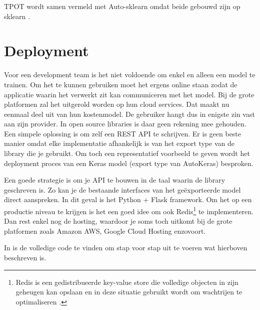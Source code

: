 TPOT wordt samen vermeld met Auto-sklearn omdat beide gebouwd zijn op sklearn \autocite{Olson2016}.

\section{Deployment}
\label{sec:deployment}

Voor een development team is het niet voldoende om enkel en alleen een model te trainen. Om het te kunnen gebruiken moet het ergens online staan zodat de applicatie waarin het verwerkt zit kan communiceren met het model. Bij de grote platformen zal het uitgerold worden op hun cloud services. Dat maakt nu eenmaal deel uit van hun kostenmodel. De gebruiker hangt dus in enigste zin vast aan zijn provider. 
In open source libraries is daar geen rekening mee gehouden. Een simpele oplossing is om zelf een REST API te schrijven. Er is geen beste manier omdat elke implementatie afhankelijk is van het export type van de library die je gebruikt. Om toch een representatief voorbeeld te geven wordt het deployment proces van een Keras model (export type van AutoKeras) besproken. 

Een goede strategie is om je API te bouwen in de taal waarin de library geschreven is. Zo kan je de bestaande interfaces van het geëxporteerde model direct aanspreken. In dit geval is het Python + Flask framework. Om het op een productie niveau te krijgen is het een goed idee om ook Redis\footnote{Redis is een gedistribueerde key-value store die volledige objecten in zijn geheugen kan opslaan en in deze situatie gebruikt wordt om wachtrijen te optimaliseren \autocite{Adrian2018}.} te implementeren. Dan rest enkel nog de hosting, waardoor je soms toch uitkomt bij de grote platformen zoals Amazon AWS, Google Cloud Hosting enzovoort.

In \textcite{Adrian2018} is de volledige code te vinden om stap voor stap uit te voeren wat hierboven beschreven is.
